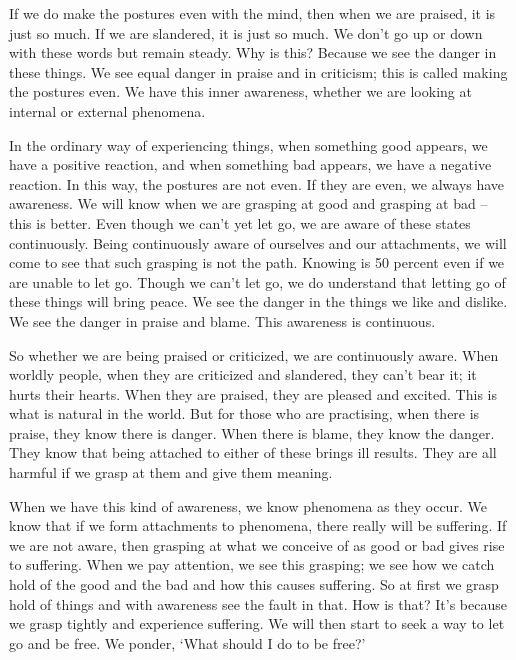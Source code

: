 If we do make the postures even with the mind, then when we are praised, it is just so much. If we are slandered, it is just so much. We don't go up or down with these words but remain steady. Why is this? Because we see the danger in these things. We see equal danger in praise and in criticism; this is called making the postures even. We have this inner awareness, whether we are looking at internal or external phenomena.

In the ordinary way of experiencing things, when something good appears, we have a positive reaction, and when something bad appears, we have a negative reaction. In this way, the postures are not even. If they are even, we always have awareness. We will know when we are grasping at good and grasping at bad -- this is better. Even though we can't yet let go, we are aware of these states continuously. Being continuously aware of ourselves and our attachments, we will come to see that such grasping is not the path. Knowing is 50 percent even if we are unable to let go. Though we can't let go, we do understand that letting go of these things will bring peace. We see the danger in the things we like and dislike. We see the danger in praise and blame. This awareness is continuous.

So whether we are being praised or criticized, we are continuously aware. When worldly people, when they are criticized and slandered, they can't bear it; it hurts their hearts. When they are praised, they are pleased and excited. This is what is natural in the world. But for those who are practising, when there is praise, they know there is danger. When there is blame, they know the danger. They know that being attached to either of these brings ill results. They are all harmful if we grasp at them and give them meaning.

When we have this kind of awareness, we know phenomena as they occur. We know that if we form attachments to phenomena, there really will be suffering. If we are not aware, then grasping at what we conceive of as good or bad gives rise to suffering. When we pay attention, we see this grasping; we see how we catch hold of the good and the bad and how this causes suffering. So at first we grasp hold of things and with awareness see the fault in that. How is that? It's because we grasp tightly and experience suffering. We will then start to seek a way to let go and be free. We ponder, `What should I do to be free?'

